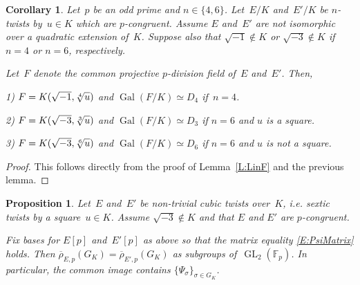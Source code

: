 \documentclass[12pt, reqno]{amsart}
\newcommand{\F}{\mathbb{F}}
\newcommand{\rhobar}{{\overline{\rho}}}
\DeclareMathOperator{\Gal}{Gal}
\newcommand{\GL}{\operatorname{GL}}
\numberwithin{equation}{section}
\newtheorem{corollary}[theorem]{Corollary}
\newtheorem{proposition}[theorem]{Proposition}
\theoremstyle{definition}
\theoremstyle{remark}
\begin{document}
\begin{corollary}
Let~$p$ be an odd prime and $n \in \{4,6 \}$. Let~$E/K$ and~$E'/K$ be $n$-twists by~$u \in K$ which are $p$-congruent. 
Assume $E$ and~$E'$
are not isomorphic over a quadratic extension of~$K$. Suppose also that $\sqrt{-1} \not\in K$ or
$\sqrt{-3} \not\in K$ if $n=4$ or $n=6$, respectively.

Let~$F$ denote the common projective $p$-division field of~$E$ and~$E'$. Then,

1) $F = K(\sqrt{-1}, \root 4 \of u)$ and $\Gal(F/K) \simeq D_4$ if~$n = 4$.

2) $F = K(\sqrt{-3}, \root 3 \of u)$
and $\Gal(F/K) \simeq D_3$ if $n=6$ and $u$ is a square.

3) $F = K(\sqrt{-3}, \root 6 \of u)$
and $\Gal(F/K) \simeq D_6$ if $n=6$ and $u$ is not a square.
\end{corollary}
\begin{proof} This follows directly from the proof of Lemma~\ref{L:LinF} and the previous lemma.
\end{proof}

\begin{proposition} \label{P:PsiInImage}
Let~$E$ and~$E'$ be non-trivial cubic twists over~$K$, i.e. sextic twists by a square~$u \in K$. Assume $\sqrt{-3} \not\in K$ and that $E$ and $E'$ are $p$-congruent.

Fix bases for $E[p]$ and~$E'[p]$ as above so that the matrix equality \eqref{E:PsiMatrix} holds. Then 
$\rhobar_{E,p}(G_K) = \rhobar_{E',p}(G_K)$ 
as subgroups of~$\GL_2(\F_p)$. In particular, the common image contains $\{ \Psi_\sigma \}_{\sigma \in G_K}$.
\end{proposition}
\end{document}
